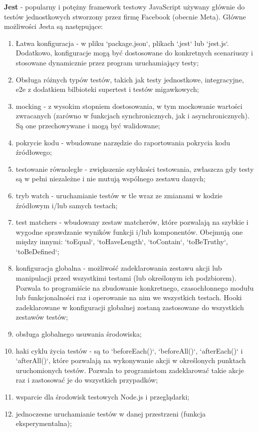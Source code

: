 \documentclass[12pt, a4paper, twoside, openany]{book}
\begin{document}
\textbf{Jest} - popularny i potężny framework testowy JavaScript używany głównie do testów jednostkowych stworzony przez firmę Facebook (obecnie Meta). Główne możliwości Jesta są następujące:
\begin{enumerate}[label=--]
    \item Łatwa konfiguracja - w pliku `package.json`, plikach `.jest` lub `jest.js`. Dodatkowo, konfiguracje mogą być dostosowane do konkretnych scenariuszy i stosowane dynamicznie przez program uruchamiający testy;
    \item Obsługa różnych typów testów, takich jak testy jednostkowe, integracyjne, e2e z dodatkiem bilbioteki supertest i testów migawkowych;
    \item mocking - z wysokim stopniem dostosowania, w tym mockowanie wartości zwracanych (zarówno w funkcjach synchronicznych, jak i asynchronicznych). Są one przechowywane i mogą być walidowane;
    \item pokrycie kodu - wbudowane narzędzie do raportowania pokrycia kodu źródłowego;
    \item testowanie równoległe - zwiększenie szybkości testowania, zwłaszcza gdy testy są w pełni niezależne i nie mutują wspólnego zestawu danych;
    \item tryb watch - uruchamianie testów w tle wraz ze zmianami w kodzie źródłowym i/lub samych testach;
    \item test matchers - wbudowany zestaw matcherów, które pozwalają na szybkie i wygodne sprawdzanie wyników funkcji i/lub komponentów. Obejmują one między innymi: `toEqual`, `toHaveLength`, `toContain`, `toBeTruthy`, `toBeDefined`;
    \item konfiguracja globalna - możliwość zadeklarowania zestawu akcji lub manipulacji przed wszystkimi testami (lub określonym ich podzbiorem). Pozwala to programiście na zbudowanie konkretnego, czasochłonnego modułu lub funkcjonalności raz i operowanie na nim we wszystkich testach. Hooki zadeklarowane w konfiguracji globalnej zostaną zastosowane do wszystkich zestawów testów;
    \item obsługa globalnego usuwania środowiska;
    \item haki cyklu życia testów - są to `beforeEach()`, `beforeAll()`, `afterEach()` i `afterAll()`, które pozwalają na wykonywanie akcji w określonych punktach uruchomionych testów. Pozwala to programistom zadeklarować takie akcje raz i zastosować je do wszystkich przypadków;
    \item wsparcie dla środowisk testowych Node.js i przeglądarki;
    \item jednoczesne uruchamianie testów w danej przestrzeni (funkcja eksperymentalna);
\end{enumerate}
\end{document}
